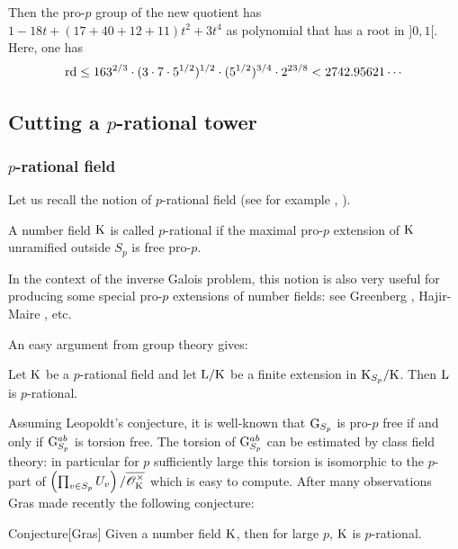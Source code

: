 \documentclass[12pt,a4paper,twoside,english]{smfart}
\def\G{{\rm G}}
\def\K{{\rm K}}
\def\L{{\rm L}}
\def\rd{{\rm rd}}
\def\O{{\mathcal O}}
\newenvironment{conjecture}{\begin{enonce}{Conjecture}}{\end{enonce}}
\begin{document}
 Then the pro-$p$ group of the new quotient has $1-18t+(17+40+12+11)t^2+3t^4$ as polynomial that  has a root in $]0,1[$. Here, one has $$\rd \leq 163^{2/3} \cdot (3 \cdot 7 \cdot 5^{1/2})^{1/2} \cdot (5^{1/2})^{3/4}\cdot 2^{23/8} \color{black}< 2742.95621 \cdots$$
 
 \subsection{Cutting a $p$-rational tower}
 
 \subsubsection{$p$-rational field}
 
 Let us recall the notion of $p$-rational field (see for example \cite{Gras-Jaulent}, \cite{Mova-Nguyen}).
 
 \begin{defi}
 A number field $\K$ is called $p$-rational if the maximal pro-$p$ extension of $\K$ unramified outside $S_p$ is free pro-$p$.
 \end{defi}
 
 
In the context of the inverse Galois problem, this notion is also very useful for producing some special pro-$p$ extensions of number fields: see Greenberg \cite{Greenberg},
Hajir-Maire  \cite{Hajir-Maire-mu}, etc.
 
 
 
An easy argument from group theory gives:
 
\begin{prop} \label{prop:prationalheridity}
Let $\K$ be a $p$-rational field and let $\L/\K$ be a finite extension in $\K_{S_p}/\K$. Then $\L$ is $p$-rational.
\end{prop} 
 

 
   
 Assuming Leopoldt's conjecture, it is well-known that $\G_{S_p}$ is pro-$p$ free if and only if $\G_{S_p}^{ab}$ is torsion free.
   The torsion of $\G_{S_p}^{ab}$ can be estimated by class field theory: in particular for $p$ sufficiently large this torsion is isomorphic to the $p$-part of $\left(\prod_{v\in S_p} U_v \right)/\overline{\O_\K^\times}$ which is easy to compute. 
   After many  observations Gras \cite[Conjecture 7.11]{Gras-CJM} made recently  the following conjecture:
   
 \begin{conjecture}[Gras]
 Given  a number field $\K$, then for large $p$,  $\K$ is $p$-rational.
 \end{conjecture}
 
\end{document}
